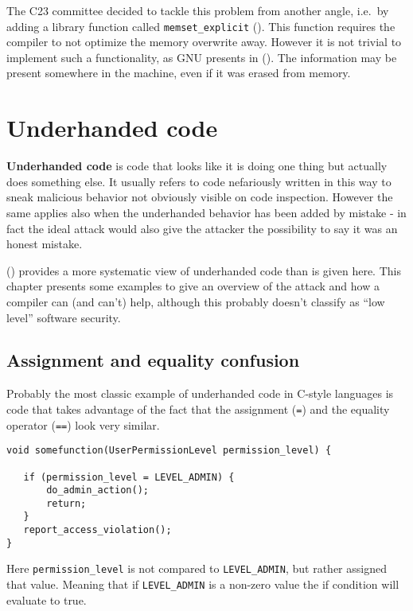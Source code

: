 \documentclass[
  a4paper,
]{report}
\begin{document}
The C23 committee decided to tackle this problem from another angle,
i.e.~by adding a library function called \texttt{memset\_explicit}
(). This
function requires the compiler to not optimize the memory overwrite
away. However it is not trivial to implement such a functionality, as
GNU presents in (). The information may be present somewhere in the machine, even if
it was erased from memory.

\chapter{Underhanded code}\label{underhanded-code}

\textbf{Underhanded code} is code that looks like it is doing one thing
but actually does something else. It usually refers to code nefariously
written in this way to sneak malicious behavior not obviously visible on
code inspection. However the same applies also when the underhanded
behavior has been added by mistake - in fact the ideal attack would also
give the attacker the possibility to say it was an honest mistake.

() provides a more systematic
view of underhanded code than is given here. This chapter presents some
examples to give an overview of the attack and how a compiler can (and
can't) help, although this probably doesn't classify as ``low level''
software security.

\section{Assignment and equality
confusion}\label{assignment-and-equality-confusion}

Probably the most classic example of underhanded code in C-style
languages is code that takes advantage of the fact that the assignment
(\texttt{=}) and the equality operator (\texttt{==}) look very similar.

\begin{verbatim}
void somefunction(UserPermissionLevel permission_level) {

   if (permission_level = LEVEL_ADMIN) {
       do_admin_action();
       return;
   }
   report_access_violation();
}
\end{verbatim}

Here \texttt{permission\_level} is not compared to
\texttt{LEVEL\_ADMIN}, but rather assigned that value. Meaning that if
\texttt{LEVEL\_ADMIN} is a non-zero value the if condition will evaluate
to true.
\end{document}
